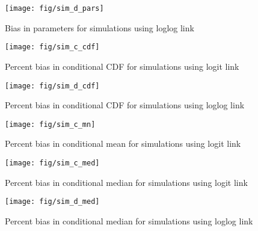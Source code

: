 \documentclass[
]{article}
\newcommand{\beginsupplement}{
  \setcounter{table}{0}
  \renewcommand{\thetable}{S\arabic{table}}
  \setcounter{figure}{0}
  \renewcommand{\thefigure}{S\arabic{figure}}
}
\begin{document}
\beginsupplement

\begin{figure}

{\centering \texttt{[image: fig/sim\_d\_pars]} 

}

\caption{Bias in parameters for simulations using loglog link}\label{fig:simplt-pars-3}
\end{figure}

\begin{figure}

{\centering \texttt{[image: fig/sim\_c\_cdf]} 

}

\caption{Percent bias in conditional CDF for simulations using logit link}\label{fig:simplt-cdf-2}
\end{figure}

\begin{figure}

{\centering \texttt{[image: fig/sim\_d\_cdf]} 

}

\caption{Percent bias in conditional CDF for simulations using loglog link}\label{fig:simplt-cdf-3}
\end{figure}

\begin{figure}

{\centering \texttt{[image: fig/sim\_c\_mn]} 

}

\caption{Percent bias in conditional mean for simulations using logit link}\label{fig:simplt-mn-2}
\end{figure}

\begin{figure}

{\centering \texttt{[image: fig/sim\_c\_med]} 

}

\caption{Percent bias in conditional median for simulations using logit link}\label{fig:simplt-med-2}
\end{figure}

\begin{figure}

{\centering \texttt{[image: fig/sim\_d\_med]} 

}

\caption{Percent bias in conditional median for simulations using loglog link}\label{fig:simplt-med-3}
\end{figure}
\end{document}
